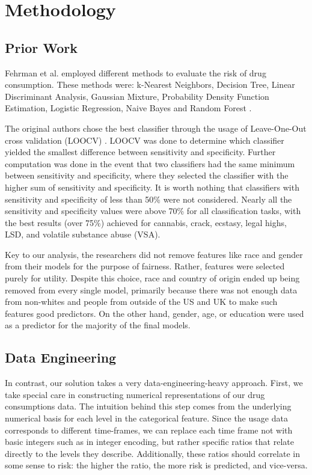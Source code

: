 \documentclass{article}
\begin{document}
\section{Methodology}
    \subsection{Prior Work}
    Fehrman et al. employed different methods to evaluate the risk of drug consumption. These methods were: k-Nearest Neighbors, Decision Tree, Linear Discriminant Analysis, Gaussian Mixture, Probability Density Function Estimation, Logistic Regression, Naive Bayes and Random Forest \cite{Fehrman}.

    The original authors chose the best classifier through the usage of Leave-One-Out cross validation (LOOCV) \cite{Fehrman}. LOOCV was done to determine which classifier yielded the smallest difference between sensitivity and specificity. Further computation was done in the event that two classifiers had the same minimum between sensitivity and specificity, where they selected the classifier with the higher sum of sensitivity and specificity. It is worth nothing that classifiers with sensitivity and specificity of less than 50\% were not considered. Nearly all the sensitivity and specificity values were above 70\% for all classification tasks, with the best results (over 75\%) achieved for cannabis, crack, ecstasy, legal highs, LSD, and volatile substance abuse (VSA).

    Key to our analysis, the researchers did not remove features like race and gender from their models for the purpose of fairness. Rather, features were selected purely for utility. Despite this choice, race and country of origin ended up being removed from every single model, primarily because there was not enough data from non-whites and people from outside of the US and UK to make such features good predictors. On the other hand, gender, age, or education were used as a predictor for the majority of the final models.

    
    \subsection{Data Engineering}
    In contrast, our solution takes a very data-engineering-heavy approach. First, we take special care in constructing numerical representations of our drug consumptions data. The intuition behind this step comes from the underlying numerical basis for each level in the categorical feature. Since the usage data corresponds to different time-frames, we can replace each time frame not with basic integers such as in integer encoding, but rather specific ratios that relate directly to the levels they describe. Additionally, these ratios should correlate in some sense to risk: the higher the ratio, the more risk is predicted, and vice-versa.
    
\end{document}
